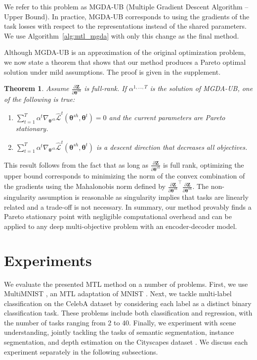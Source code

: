 \documentclass{article}
\newtheorem{theorem}{Theorem}
\def\ZZ{\mathbf{Z}}
\def\lL{\mathcal{L}}
\def\btheta{{\bm\theta}}
\begin{document}
We refer to this problem as MGDA-UB (Multiple Gradient Descent Algorithm -- Upper Bound). In practice, MGDA-UB corresponds to using the gradients of the task losses with respect to the representations instead of the shared parameters. We use Algorithm~\ref{alg:mtl_mgda} with only this change as the final method.

Although MGDA-UB is an approximation of the original optimization problem, we now state a theorem that shows that our method produces a Pareto optimal solution under mild assumptions. The proof is given in the supplement.

\begin{theorem}
Assume $\frac{\partial \mathbf{Z}}{\partial \mathbf{\theta}^{sh}}$ is full-rank. If $\alpha^{1,\ldots,T}$ is the solution of MGDA-UB, one of the following is true:
\begin{enumerate}[ topsep=0pt, label=\emph{(\alph*)},align=left,leftmargin=*]
\item $\sum_{t=1}^T \alpha^t \nabla_{\btheta^{sh}}  \hat{\lL}^t(\btheta^{sh},\btheta^t)=0$ and the current parameters are Pareto stationary.
\item $\sum_{t=1}^T \alpha^t \nabla_{\btheta^{sh}}  \hat{\lL}^t(\btheta^{sh},\btheta^t)$ is a descent direction that decreases all objectives.
\end{enumerate}
\label{thm}
\end{theorem}

This result follows from the fact that as long as $\frac{\partial \ZZ}{\partial \btheta^{sh}}$ is full rank, optimizing the upper bound corresponds to minimizing the norm of the convex combination of the gradients using the Mahalonobis norm defined by $\frac{\partial \ZZ}{\partial \btheta^{sh}}^\intercal \frac{\partial \ZZ}{\partial \btheta^{sh}}$. The non-singularity assumption is reasonable as singularity implies that tasks are linearly related and a trade-off is not necessary. In summary, our method provably finds a Pareto stationary point with negligible computational overhead and can be applied to any deep multi-objective problem with an encoder-decoder model.
 
\section{Experiments}
\label{sec:experiments}


We evaluate the presented MTL method on a number of problems. First, we use MultiMNIST \citep{multi_mnist}, an MTL adaptation of MNIST \citep{mnist}. Next, we tackle multi-label classification on the CelebA dataset \citep{celeba} by considering each label as a distinct binary classification task. These problems include both classification and regression, with the number of tasks ranging from 2 to 40. Finally, we experiment with scene understanding, jointly tackling the tasks of semantic segmentation, instance segmentation, and depth estimation on the Cityscapes dataset \citep{cityscapes}. We discuss each experiment separately in the following subsections.
\end{document}
